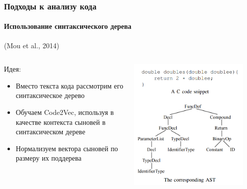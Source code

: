 \documentclass[10pt]{beamer}
\begin{document}
\begin{frame}
\frametitle{Подходы к анализу кода}
\framesubtitle{Использование синтаксического дерева}

(Mou et al., 2014)

\begin{columns}
    \begin{column}{0.6\textwidth}
		Идея:
        \begin{itemize}
			\item Вместо текста кода рассмотрим его синтаксическое дерево
			\item Обучаем Code2Vec, используя в качестве контекста сыновей в синтаксическом дереве
			\item Нормализуем вектора сыновей по размеру их поддерева
		\end{itemize}
    \end{column}
    \begin{column}{0.4\textwidth}
        \begin{center}
            \includegraphics[width=0.9\textwidth]{images/ast.png} 
        \end{center}
    \end{column}
\end{columns}

\end{frame}
\end{document}
